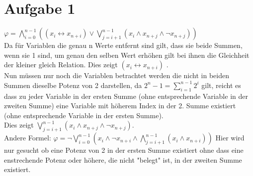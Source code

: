 \section*{Aufgabe 1}


$\varphi = \bigwedge_{i=0}^{n-1}((x_i \leftrightarrow x_{n+i}) \vee \bigvee_{j=i+1}^{n-1}( x_i \wedge x_{n+j} \wedge \neg x_{n+j}))$ \\



Da für Variablen die genau n Werte entfernt sind gilt, dass sie beide Summen, wenn sie 1 sind, um genau den selben Wert erhöhen gilt bei ihnen die Gleichheit der kleiner gleich Relation. Dies zeigt $(x_i \leftrightarrow x_{n+i})$ .\\


Nun müssen nur noch die Variablen betrachtet werden die nicht in beiden Summen dieselbe Potenz von 2 darstellen, da $2^n-1 = \sum_{i=1}^{n-1}2^i$ gilt, reicht es dass zu jeder Variable in der ersten Summe (ohne entsprechende Variable in der zweiten Summe)  eine Variable mit höherem Index in der 2. Summe  existiert (ohne entsprechende Variable in der ersten Summe).\\

Dies zeigt $ \bigvee_{j=i+1}^{n-1}( x_i \wedge x_{n+j} \wedge \neg x_{n+j})$. \\



Andere Formel: $ \varphi = \neg \bigvee_{i=0}^{n-1}(x_i \wedge \neg x_{n+i} \wedge \bigwedge_{j=i+1}^{n-1} (x_i \wedge x_{n+i}))$ 
Hier wird nur gesucht ob eine Potenz von 2 in der ersten Summe existiert ohne dass eine enstrechende Potenz oder höhere, die nicht "belegt" ist, in der zweiten Summe existiert.